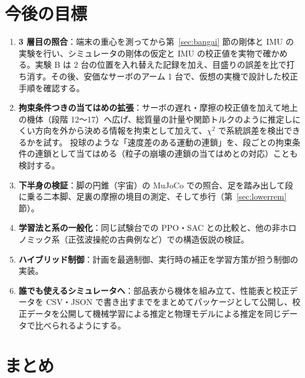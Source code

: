 \documentclass[paper=a4paper,fontsize=10pt,twocolumn,column_gap=2zw,line_length=24zw,number_of_lines=46,head_space=20mm]{jlreq}
\begin{document}
\section{今後の目標}

\begin{enumerate}\setlength{\itemsep}{0pt}
\item \textbf{3 層目の照合}：端末の重心を測ってから第~\ref{sec:bangai} 節の剛体と IMU の実験を行い、シミュレータの剛体の仮定と IMU の校正値を実物で確かめる。実験 B は 2 台の位置を入れ替えた記録を加え、目盛りの誤差を比で打ち消す。その後、安価なサーボのアーム 1 台で、仮想の実機で設計した校正手順を確認する。
\item \textbf{拘束条件つきの当てはめの拡張}：サーボの遅れ・摩擦の校正値を加えて地上の機体（段階 12〜17）へ広げ、総質量の計量や関節トルクのように推定しにくい方向を外から決める情報を拘束として加えて、$\chi^2$ で系統誤差を検出できるかを試す。
投球のような「速度差のある運動の連鎖」を、段ごとの拘束条件の連鎖として当てはめる（粒子の崩壊の連鎖の当てはめとの対応）ことも検討する。
\item \textbf{下半身の検証}：脚の円錐（宇宙）の MuJoCo での照合、足を踏み出して段に乗る二本脚、足裏の摩擦の境目の測定、そして歩行（第~\ref{sec:lowerrem} 節）。
\item \textbf{学習法と系の一般化}：同じ試験台での PPO・SAC との比較と、他の非ホロノミック系（正弦波操舵の古典例など）での構造仮説の検証。
\item \textbf{ハイブリッド制御}：計画を最適制御、実行時の補正を学習方策が担う制御の実装。
\item \textbf{誰でも使えるシミュレータへ}：部品表から機体を組み立て、性能表と校正データを CSV・JSON で書き出すまでをまとめてパッケージとして公開し、校正データを公開して機械学習による推定と物理モデルによる推定を同じデータで比べられるようにする。
\end{enumerate}


\section{まとめ}
\end{document}
